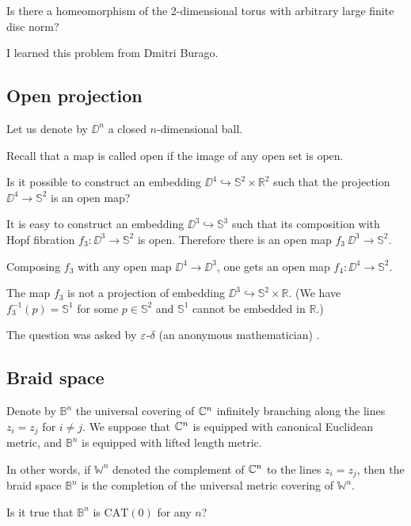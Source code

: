\begin{pr}
Is there a homeomorphism of the 2-dimensional torus with arbitrary large finite disc norm?
\end{pr}
I learned this problem from Dmitri Burago.

\subsection*{Open projection}

Let us denote by $\DD^n$ a closed $n$-dimensional ball.

Recall that a map is called open if the image of any open set is open.

\begin{pr}
Is it possible to construct an embedding $\DD^4\hookrightarrow \mathbb{S}^2\times
\mathbb R^2$
such that the projection  $\DD^4\to \mathbb{S}^2$ is an open map?
\end{pr}


It is easy to construct an embedding $\DD^3\hookrightarrow \mathbb{S}^3$ such that
its composition with Hopf fibration $f_3:\DD^3\to \mathbb{S}^2$ is open.
Therefore there is an open map $f_3\:\DD^3\to\mathbb{S}^2$.

Composing $f_3$ with any open map $\DD^4\to \DD^3$,
one gets an open map $f_4:\DD^4\to \mathbb{S}^2$.

The map $f_3$ is not a projection of embedding  $\DD^3\hookrightarrow \mathbb{S}^2\times\mathbb R$.
(We have $f_3^{-1}(p)=\mathbb{S}^1$ for some $p\in \mathbb{S}^2$ and $\mathbb{S}^1$ cannot be embedded in $\mathbb R$.)  

The question was asked by $\varepsilon$-$\delta$ (an anonymous mathematician)  \cite{epsilon-delta}.

\subsection*{Braid space}

Denote by $\mathbb{B}^n$ the universal covering of $\mathbb{C}^n$ infinitely branching along the lines $z_i=z_j$ for $i\ne j$.
We suppose that $\mathbb{C}^n$ is equipped with canonical Euclidean metric, 
and $\mathbb{B}^n$ is equipped with lifted length metric.

In other words, if $\mathbb{W}^n$ denoted the complement of $\mathbb{C}^n$ to the lines $z_i=z_j$,
then the braid space $\mathbb{B}^n$ is the completion of the universal metric covering of $\mathbb{W}^n$.

\begin{pr}
Is it true that $\mathbb{B}^n$ is $\mathrm{CAT}(0)$ for any $n$? 
\end{pr}

